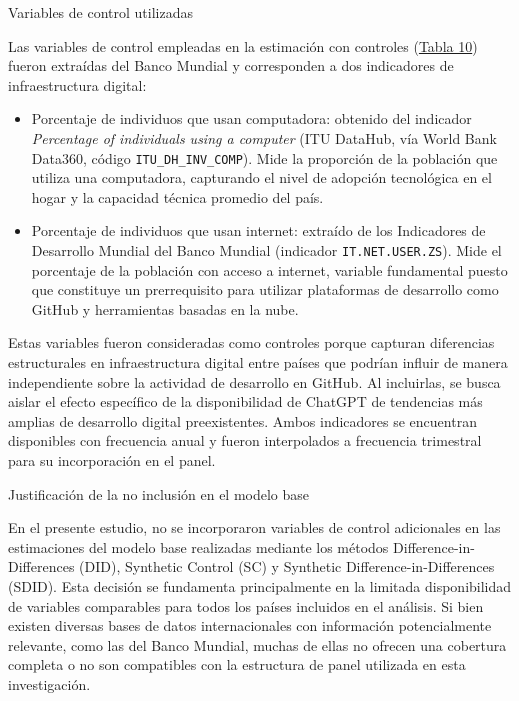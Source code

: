 \documentclass[12pt,a4paper]{article}
\let\textbf\textmd
\begin{document}
\noindent\textbf{Variables de control utilizadas}

Las variables de control empleadas en la estimación con controles (\hyperref[tab:tabla4]{Tabla 10}) fueron extraídas del \textbf{Banco Mundial} y corresponden a dos indicadores de infraestructura digital:

\begin{itemize}
  \item \textbf{Porcentaje de individuos que usan computadora}: obtenido del indicador \textit{Percentage of individuals using a computer} (ITU DataHub, vía World Bank Data360, código \texttt{ITU\_DH\_INV\_COMP}). Mide la proporción de la población que utiliza una computadora, capturando el nivel de adopción tecnológica en el hogar y la capacidad técnica promedio del país.
  \item \textbf{Porcentaje de individuos que usan internet}: extraído de los Indicadores de Desarrollo Mundial del Banco Mundial (indicador \texttt{IT.NET.USER.ZS}). Mide el porcentaje de la población con acceso a internet, variable fundamental puesto que constituye un prerrequisito para utilizar plataformas de desarrollo como GitHub y herramientas basadas en la nube.
\end{itemize}

Estas variables fueron consideradas como controles porque capturan diferencias estructurales en infraestructura digital entre países que podrían influir de manera independiente sobre la actividad de desarrollo en GitHub. Al incluirlas, se busca aislar el efecto específico de la disponibilidad de ChatGPT de tendencias más amplias de desarrollo digital preexistentes. Ambos indicadores se encuentran disponibles con frecuencia anual y fueron interpolados a frecuencia trimestral para su incorporación en el panel.

\bigskip
\noindent\textbf{Justificación de la no inclusión en el modelo base}

En el presente estudio, no se incorporaron variables de control adicionales en las estimaciones del modelo base realizadas mediante los métodos Difference-in-Differences (DID), Synthetic Control (SC) y Synthetic Difference-in-Differences (SDID). Esta decisión se fundamenta principalmente en la limitada disponibilidad de variables comparables para todos los países incluidos en el análisis. Si bien existen diversas bases de datos internacionales con información potencialmente relevante, como las del Banco Mundial, muchas de ellas no ofrecen una cobertura completa o no son compatibles con la estructura de panel utilizada en esta investigación.
\end{document}
